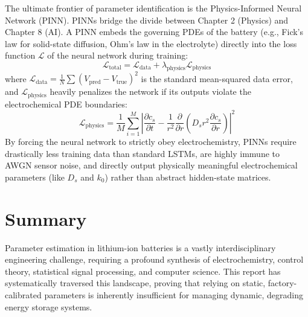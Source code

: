 The ultimate frontier of parameter identification is the Physics-Informed Neural Network (PINN). PINNs bridge the divide between Chapter 2 (Physics) and Chapter 8 (AI). A PINN embeds the governing PDEs of the battery (e.g., Fick's law for solid-state diffusion, Ohm's law in the electrolyte) directly into the loss function $\mathcal{L}$ of the neural network during training:
\begin{equation}
\label{eq:pinn_loss}
\mathcal{L}_{\mathrm{total}} = \mathcal{L}_{\mathrm{data}} + \lambda_{\mathrm{physics}} \mathcal{L}_{\mathrm{physics}}
\end{equation}
where $\mathcal{L}_{\mathrm{data}} = \frac{1}{N} \sum (V_{\mathrm{pred}} - V_{\mathrm{true}})^2$ is the standard mean-squared data error, and $\mathcal{L}_{\mathrm{physics}}$ heavily penalizes the network if its outputs violate the electrochemical PDE boundaries:
\begin{equation}
\label{eq:pinn_physics}
\mathcal{L}_{\mathrm{physics}} = \frac{1}{M} \sum_{i=1}^{M} \left| \frac{\partial c_s}{\partial t} - \frac{1}{r^2} \frac{\partial}{\partial r} \left( D_s r^2 \frac{\partial c_s}{\partial r} \right) \right|^2
\end{equation}
By forcing the neural network to strictly obey electrochemistry, PINNs require drastically less training data than standard LSTMs, are highly immune to AWGN sensor noise, and directly output physically meaningful electrochemical parameters (like $D_s$ and $k_0$) rather than abstract hidden-state matrices.

\vspace{3cm}

\section{Summary}
\label{sec:summary_ch12}

Parameter estimation in lithium-ion batteries is a vastly interdisciplinary engineering challenge, requiring a profound synthesis of electrochemistry, control theory, statistical signal processing, and computer science. This report has systematically traversed this landscape, proving that relying on static, factory-calibrated parameters is inherently insufficient for managing dynamic, degrading energy storage systems. 

